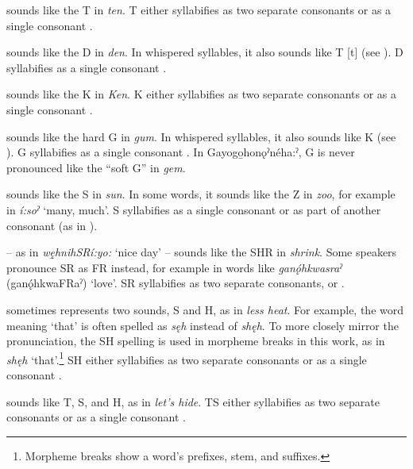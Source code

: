 \begin{description}[font=\normalfont]
\item[T] sounds like the T  in \textit{ten}. T either syllabifies as two separate consonants  or as a single consonant .

\item[D] sounds like the D  in \textit{den}. In whispered syllables, it also sounds like T [t] (see ). D syllabifies as a single consonant . 

\item[K] sounds like the K  in \textit{Ken}. K either syllabifies as two separate consonants  or as a single consonant .

\item[G] sounds like the hard G  in \textit{gum}. In whispered syllables, it also sounds like K  (see ). G syllabifies as a single consonant . In Gayogo̱honǫˀnéha:ˀ, G is never pronounced like the “soft G” in \textit{gem}.

\item[S] sounds like the S  in \textit{sun}. In some words, it sounds like the Z  in \textit{zoo}, for example in \textit{í:soˀ} ‘many, much’. S syllabifies as a single consonant  or as part of another consonant (as in ).

\item[SR] – as in \textit{wę̱hnihSRí:yo:} ‘nice day’ –  sounds like the SHR  in \textit{shrink}. Some speakers pronounce SR as FR  instead, for example in words like \textit{ganǫ́hkwasraˀ} (ganǫ́hkwaFRaˀ) ‘love’. SR syllabifies as two separate consonants,  or .

\item[S] sometimes represents two sounds, S and H, as in \textit{less heat}. For example, the word meaning ‘that’ is often spelled as \textit{sęh}  instead of \textit{shęh}. To more closely mirror the pronunciation, the SH spelling is used in morpheme breaks in this work, as in \textit{shęh} ‘that’.\footnote{Morpheme breaks show a word’s prefixes, stem, and suffixes.} SH either syllabifies as two separate consonants  or as a single consonant .

\item[TS] sounds like T, S, and H, as in \textit{let’s hide}. TS either syllabifies as two separate consonants  or as a single consonant .


\end{description}
